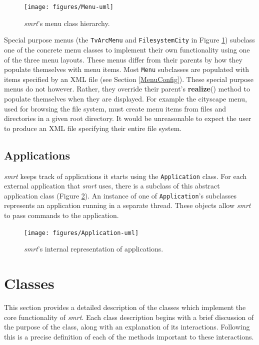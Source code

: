 \documentclass[letterpaper, titlepage, 11pt]{article}
\begin{document}
\begin{figure}[htb]
\centering
\texttt{[image: figures/Menu-uml]}
\caption{\textit{smrt}'s menu class hierarchy.\label{fig:Menu}}
\end{figure}

Special purpose menus (the \texttt{TvArcMenu} and \texttt{FilesystemCity} in
Figure \ref{fig:Menu}) subclass one of the concrete menu classes to implement
their own functionality using one of the three menu layouts. These menus differ
from their parents by how they populate themselves with menu items. Most
\texttt{Menu} subclasses are populated with items specified by an XML file (see
Section \ref{MenuConfig}). These special purpose menus do not however.  Rather,
they override their parent's \textbf{realize}() method to populate themselves
when they are displayed. For example the cityscape menu, used for browsing the
file system, must create menu items from files and directories in a given root
directory.  It would be unreasonable to expect the user to produce an XML file
specifying their entire file system.

\subsection{Applications}
\textit{smrt} keeps track of applications it starts using the
\texttt{Application} class. For each external application that \textit{smrt}
uses, there is a subclass of this abstract application class (Figure
\ref{fig:Application}). An instance of one of \texttt{Application}'s subclasses
represents an application running in a separate thread. These objects allow
\textit{smrt} to pass commands to the application.

\begin{figure}[htb]
\centering
\texttt{[image: figures/Application-uml]}
\caption{\textit{smrt}'s internal representation of applications.\label{fig:Application}}
\end{figure}

\section{Classes}
\label{Classes}
This section provides a detailed description of the classes which implement the
core functionality of \textit{smrt}.  Each class description begins with a
brief discussion of the purpose of the class, along with an explanation of its
interactions.  Following this is a precise definition of each of the methods
important to these interactions.
\end{document}
